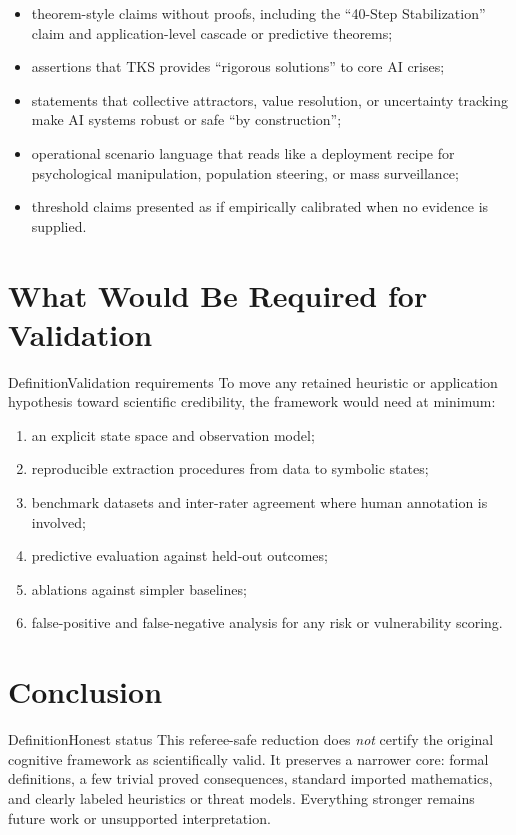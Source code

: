 \documentclass[11pt]{article}
\theoremstyle{plain}
\begin{document}
\begin{itemize}[leftmargin=1.5em]
\item theorem-style claims without proofs, including the ``40-Step
Stabilization'' claim and application-level cascade or predictive theorems;
\item assertions that TKS provides ``rigorous solutions'' to core AI crises;
\item statements that collective attractors, value resolution, or uncertainty
tracking make AI systems robust or safe ``by construction'';
\item operational scenario language that reads like a deployment recipe for
psychological manipulation, population steering, or mass surveillance;
\item threshold claims presented as if empirically calibrated when no evidence
is supplied.
\end{itemize}

\section{What Would Be Required for Validation}

\begin{claimbox}{Definition}{Validation requirements}
To move any retained heuristic or application hypothesis toward scientific
credibility, the framework would need at minimum:
\begin{enumerate}[label=(\arabic*)]
  \item an explicit state space and observation model;
  \item reproducible extraction procedures from data to symbolic states;
  \item benchmark datasets and inter-rater agreement where human annotation is
  involved;
  \item predictive evaluation against held-out outcomes;
  \item ablations against simpler baselines;
  \item false-positive and false-negative analysis for any risk or vulnerability
  scoring.
\end{enumerate}
\end{claimbox}

\section{Conclusion}

\begin{claimbox}{Definition}{Honest status}
This referee-safe reduction does \emph{not} certify the original cognitive
framework as scientifically valid. It preserves a narrower core: formal
definitions, a few trivial proved consequences, standard imported mathematics,
and clearly labeled heuristics or threat models. Everything stronger remains
future work or unsupported interpretation.
\end{claimbox}
\end{document}
